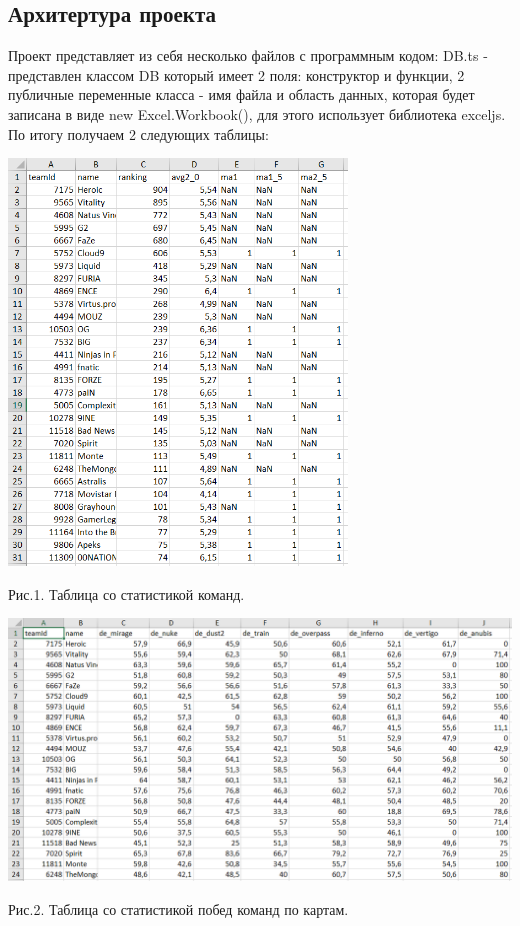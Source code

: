 \documentclass[utf8,14pt,a4paper,oneside,russian]{book}
\begin{document}
        \subsection{Архитертура проекта}
        Проект представляет из себя несколько файлов с программным кодом:
        DB.ts - представлен классом DB который имеет 2 поля: конструктор и
         функции, 2 публичные переменные класса - имя файла и область данных, 
         которая будет записана в виде new Excel.Workbook(), для этого использует 
         библиотека exceljs.
         По итогу получаем 2 следующих таблицы:
         \begin{center}
         \includegraphics[width=9cm]{tbl2}
         
         Рис.1. Таблица со статистикой команд.

         \includegraphics[width=14cm]{tbl1}

         Рис.2. Таблица со статистикой побед команд по картам.
        \end{center}
\end{document}

